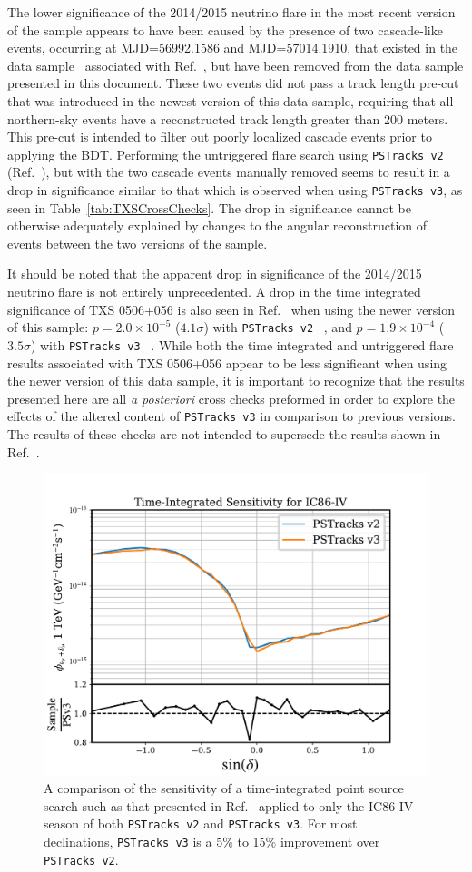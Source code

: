 \documentclass[aps,10pt,prd,twocolumn,floats,letterpaper,showpacs,nofootinbib,bibnotes,notitlepage,superscriptaddress,floatfix]{revtex4-1}
\newcommand{\MA}[1]{{\color{black}#1}}
\begin{document}
The lower significance of the 2014/2015 neutrino flare in the most recent version of the sample appears to have been caused by the presence of two cascade-like events, occurring at MJD=56992.1586 and MJD=57014.1910, that existed in the data sample~\cite{IceCube:2019} associated with Ref.~\cite{IceCube:2018cha}, but have been removed from the data sample presented in this document. These two events did not pass a track length pre-cut that was introduced in the newest version of this data sample, requiring that all northern-sky events have a reconstructed track length greater than 200 meters. This pre-cut is intended to filter out poorly localized cascade events prior to applying the BDT. Performing the untriggered flare search using {\tt PSTracks v2} (Ref.~\cite{IceCube:2019}), but with the two cascade events manually removed seems to result in a drop in significance similar to that which is observed when using {\tt PSTracks v3}, as seen in Table~\ref{tab:TXSCrossChecks}. The drop in significance cannot be otherwise adequately explained by changes to the angular reconstruction of events between the two versions of the sample. 

 It should be noted that the apparent drop in significance of the 2014/2015 neutrino flare is not entirely unprecedented. A drop in the time integrated significance of TXS 0506+056 is also seen in Ref.~\cite{Aartsen:2019fau} when using the newer version of this sample: $p=2.0 \times 10^{-5}$ ($4.1\sigma$) with \MA{\tt PSTracks v2} ~\cite{IceCube:2018cha}, and $p=1.9 \times 10^{-4}$ ($3.5\sigma$) with \MA{\tt PSTracks v3} ~\cite{Aartsen:2019fau}. While both the time integrated and untriggered flare results associated with TXS 0506+056 appear to be less significant when using the newer version of this data sample, it is important to recognize that the results presented here are all \textit{a posteriori} cross checks preformed in order to explore the effects of the altered content of \MA{\tt PSTracks v3} in comparison to previous versions. The results of these checks are not intended to supersede the results shown in Ref.~\cite{IceCube:2018cha}.

\begin{figure}[p]
\centering
\includegraphics[width=0.5\linewidth,viewport= 0 0 530 390, clip=false]{./TXSCheckPlots/v2v3_senscompare.pdf}
\caption[]{A comparison of the sensitivity of a time-integrated point source search such as that presented in Ref.~\cite{Aartsen:2019fau} applied to only the IC86-IV season of both {\tt PSTracks v2} and {\tt PSTracks v3}. For most declinations, {\tt PSTracks v3} is a 5\% to 15\% improvement over {\tt PSTracks v2}.}\label{fig:v2v3senscompare}
\end{figure}
\end{document}
